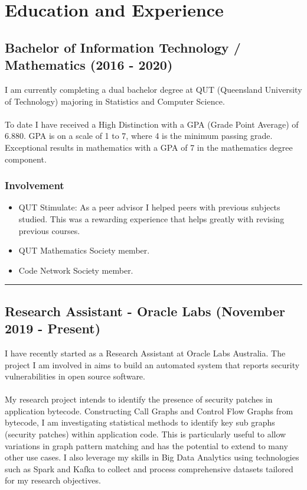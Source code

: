 \section*{Education and Experience}
\subsection*{Bachelor of Information Technology / Mathematics (2016 - 2020)}

I am currently completing a dual bachelor degree at QUT (Queensland University of Technology) majoring in Statistics and Computer Science.\\
\\
To date I have received a High Distinction with a GPA (Grade Point Average) of 6.880. GPA is on a scale of 1 to 7, where 4 is the minimum passing grade. Exceptional results in mathematics with a GPA of 7 in the mathematics degree component.

\subsubsection*{Involvement}

\begin{itemize}
  \setlength\itemsep{0.1em}
  \item QUT Stimulate: As a peer advisor I helped peers with previous subjects studied. This was a rewarding experience that helps greatly with revising previous courses.
  \item QUT Mathematics Society member.
  \item Code Network Society member.
\end{itemize}

\noindent\rule{\textwidth}{0.5pt}

\subsection*{Research Assistant - Oracle Labs (November 2019 - Present)}

I have recently started as a Research Assistant at Oracle Labs Australia. The project I am involved in aims to build an automated system that reports security vulnerabilities in open source software.\\
\\
My research project intends to identify the presence of security patches in application bytecode. Constructing Call Graphs and Control Flow Graphs from bytecode, I am investigating statistical methods to identify key sub graphs (security patches) within application code. This is particularly useful to allow variations in graph pattern matching and has the potential to extend to many other use cases. I also leverage my skills in Big Data Analytics using technologies such as Spark and Kafka to collect and process comprehensive datasets tailored for my research objectives.

